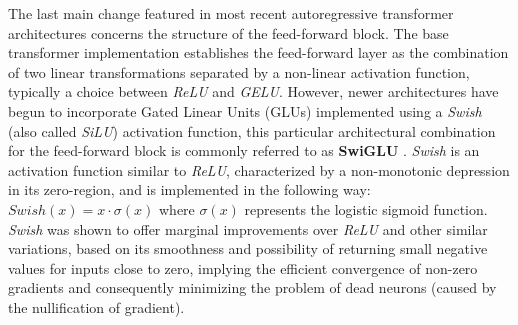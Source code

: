 The last main change featured in most recent autoregressive transformer architectures concerns the structure of the feed-forward block.
The base transformer implementation establishes the feed-forward layer as the combination of two linear transformations separated by a non-linear activation function, typically a choice between \emph{ReLU} and \emph{GELU}.
However, newer architectures have begun to incorporate Gated Linear Units (GLUs)  implemented using a \emph{Swish} (also called \emph{SiLU}) activation function, this particular architectural combination for the feed-forward block is commonly referred to as \textbf{SwiGLU} .
\emph{Swish}  is an activation function similar to \emph{ReLU}, characterized by a non-monotonic depression in its zero-region, and is implemented in the following way: $Swish(x) = x \cdot \sigma(x)$ where $\sigma(x)$ represents the logistic sigmoid function.
\emph{Swish} was shown to offer marginal improvements over \emph{ReLU} and other similar variations, based on its smoothness and possibility of returning small negative values for inputs close to zero, implying the efficient convergence of non-zero gradients and consequently minimizing the problem of dead neurons (caused by the nullification of gradient).


